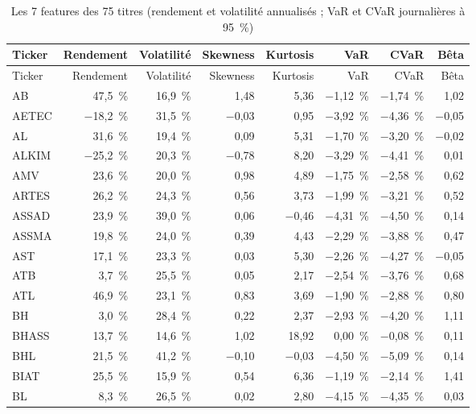 \begin{longtable}{lrrrrrrr}
\caption{Les 7 features des 75 titres (rendement et volatilité annualisés ; VaR et CVaR journalières à 95~\%)}\label{tab:annexe-features}\\
\toprule Ticker & Rendement & Volatilité & Skewness & Kurtosis & VaR & CVaR & Bêta \\ \midrule \endfirsthead
\toprule Ticker & Rendement & Volatilité & Skewness & Kurtosis & VaR & CVaR & Bêta \\ \midrule \endhead \bottomrule \endfoot
AB & 47{,}5~\% & 16{,}9~\% & 1{,}48 & 5{,}36 & $-$1{,}12~\% & $-$1{,}74~\% & 1{,}02 \\
AETEC & $-$18{,}2~\% & 31{,}5~\% & $-$0{,}03 & 0{,}95 & $-$3{,}92~\% & $-$4{,}36~\% & $-$0{,}05 \\
AL & 31{,}6~\% & 19{,}4~\% & 0{,}09 & 5{,}31 & $-$1{,}70~\% & $-$3{,}20~\% & $-$0{,}02 \\
ALKIM & $-$25{,}2~\% & 20{,}3~\% & $-$0{,}78 & 8{,}20 & $-$3{,}29~\% & $-$4{,}41~\% & 0{,}01 \\
AMV & 23{,}6~\% & 20{,}0~\% & 0{,}98 & 4{,}89 & $-$1{,}75~\% & $-$2{,}58~\% & 0{,}62 \\
ARTES & 26{,}2~\% & 24{,}3~\% & 0{,}56 & 3{,}73 & $-$1{,}99~\% & $-$3{,}21~\% & 0{,}52 \\
ASSAD & 23{,}9~\% & 39{,}0~\% & 0{,}06 & $-$0{,}46 & $-$4{,}31~\% & $-$4{,}50~\% & 0{,}14 \\
ASSMA & 19{,}8~\% & 24{,}0~\% & 0{,}39 & 4{,}43 & $-$2{,}29~\% & $-$3{,}88~\% & 0{,}47 \\
AST & 17{,}1~\% & 23{,}3~\% & 0{,}03 & 5{,}30 & $-$2{,}26~\% & $-$4{,}27~\% & $-$0{,}05 \\
ATB & 3{,}7~\% & 25{,}5~\% & 0{,}05 & 2{,}17 & $-$2{,}54~\% & $-$3{,}76~\% & 0{,}68 \\
ATL & 46{,}9~\% & 23{,}1~\% & 0{,}83 & 3{,}69 & $-$1{,}90~\% & $-$2{,}88~\% & 0{,}80 \\
BH & 3{,}0~\% & 28{,}4~\% & 0{,}22 & 2{,}37 & $-$2{,}93~\% & $-$4{,}20~\% & 1{,}11 \\
BHASS & 13{,}7~\% & 14{,}6~\% & 1{,}02 & 18{,}92 & 0{,}00~\% & $-$0{,}08~\% & 0{,}11 \\
BHL & 21{,}5~\% & 41{,}2~\% & $-$0{,}10 & $-$0{,}03 & $-$4{,}50~\% & $-$5{,}09~\% & 0{,}14 \\
BIAT & 25{,}5~\% & 15{,}9~\% & 0{,}54 & 6{,}36 & $-$1{,}19~\% & $-$2{,}14~\% & 1{,}41 \\
BL & 8{,}3~\% & 26{,}5~\% & 0{,}02 & 2{,}80 & $-$4{,}15~\% & $-$4{,}35~\% & 0{,}03 \\

\end{longtable}
